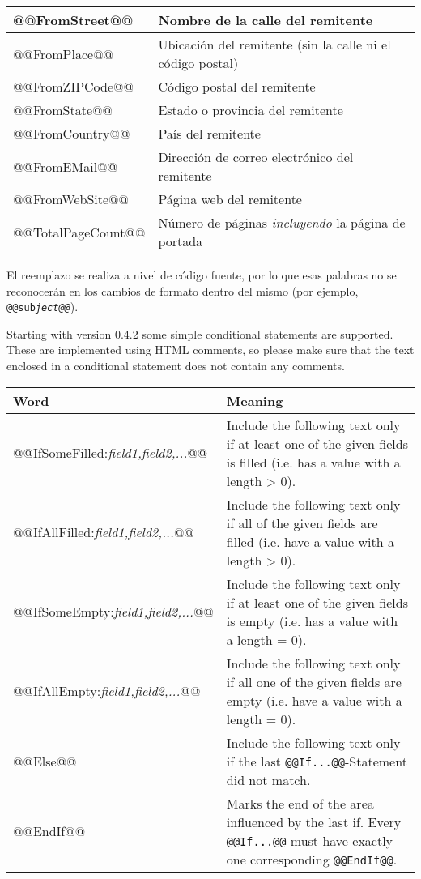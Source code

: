 \documentclass[a4paper,10pt]{scrartcl}
\begin{document}
\begin{center}
\begin{tabular}{|l|p{}|}
\ttfamily @@FromStreet@@ & Nombre de la calle del remitente \\\hline
\ttfamily @@FromPlace@@ & Ubicación del remitente (sin la calle ni el código postal)\\\hline
\ttfamily @@FromZIPCode@@ & Código postal del remitente \\\hline
\ttfamily @@FromState@@ & Estado o provincia del remitente\\\hline
\ttfamily @@FromCountry@@ & País del remitente\\\hline
\ttfamily @@FromEMail@@ & Dirección de correo electrónico del remitente\\\hline
\ttfamily @@FromWebSite@@ & Página web del remitente\\\hline
\ttfamily @@TotalPageCount@@ & Número de páginas \textit{incluyendo} la página de portada \\\hline
\end{tabular}
\end{center}

El reemplazo se realiza a nivel de código fuente, por lo que esas palabras no se reconocerán en los cambios de formato dentro del mismo (por ejemplo, \texttt{@@sub\textit{ject@@}}).

Starting with version 0.4.2 some simple conditional statements are supported. These are implemented using HTML comments, so please make sure that the text enclosed in a conditional statement does not contain any comments.
\begin{center}
\begin{tabular}{|l|p{}|}
\hline
\bfseries Word & \bfseries Meaning \\
\hline\hline
\ttfamily @@IfSomeFilled:\textit{field1,field2,...}@@ & Include the following text only if at least one of the given fields is filled (i.e. has a value with a length > 0).\\\hline
\ttfamily @@IfAllFilled:\textit{field1,field2,...}@@ & Include the following text only if all of the given fields are filled (i.e. have a value with a length > 0).\\\hline
\ttfamily @@IfSomeEmpty:\textit{field1,field2,...}@@ & Include the following text only if at least one of the given fields is empty (i.e. has a value with a length = 0).\\\hline
\ttfamily @@IfAllEmpty:\textit{field1,field2,...}@@ & Include the following text only if all one of the given fields are empty (i.e. have a value with a length = 0).\\\hline
\ttfamily @@Else@@ & Include the following text only if the last \texttt{@@If...@@}-Statement did not match.\\\hline
\ttfamily @@EndIf@@ & Marks the end of the area influenced by the last if. Every \texttt{@@If...@@} must have exactly one corresponding \texttt{@@EndIf@@}.\\\hline
\end{tabular}
\end{center}
\end{document}
